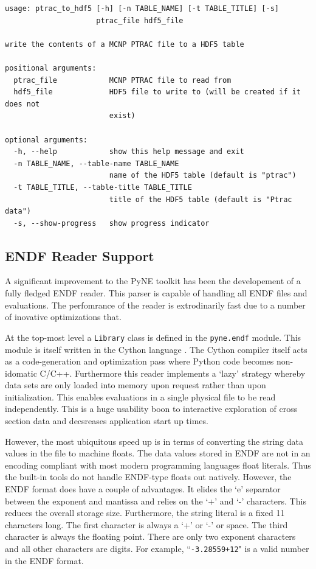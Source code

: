 \documentclass{ansconf}
\begin{document}
\begin{lstlisting}[frame=single,basicstyle=\scriptsize,label=fig_ptractohdf5,caption=Usage description of the PTRAC to HDF5 command line utility.]
usage: ptrac_to_hdf5 [-h] [-n TABLE_NAME] [-t TABLE_TITLE] [-s]
                     ptrac_file hdf5_file

write the contents of a MCNP PTRAC file to a HDF5 table

positional arguments:
  ptrac_file            MCNP PTRAC file to read from
  hdf5_file             HDF5 file to write to (will be created if it does not
                        exist)

optional arguments:
  -h, --help            show this help message and exit
  -n TABLE_NAME, --table-name TABLE_NAME
                        name of the HDF5 table (default is "ptrac")
  -t TABLE_TITLE, --table-title TABLE_TITLE
                        title of the HDF5 table (default is "Ptrac data")
  -s, --show-progress   show progress indicator
\end{lstlisting}

\subsection{ENDF Reader Support}

A significant improvement to the PyNE toolkit has been the developement of 
a fully fledged ENDF \cite{mclane2001endf} reader.  This parser is capable 
of handling all ENDF files and evaluations. The perfomrance of the reader is 
extrodinarily fast due to a number of inovative optimizations that.

At the top-most level a \texttt{Library} class is defined in the \texttt{pyne.endf}
module.  This module is itself written in the Cython language \cite{behnel2010cython}.
The Cython compiler itself acts as a code-generation and optimization pass where
Python code becomes non-idomatic C/C++.  Furthermore this reader implements a
`lazy' strategy whereby data sets are only loaded into memory upon request rather 
than upon initialization.  This enables evaluations in a single physical file to be 
read independently.  This is a huge usability boon to interactive exploration of 
cross section data and decsreases application start up times.

However, the most ubiquitous speed up is in terms of converting the string
data values in the file to machine floats.  The data values stored in ENDF 
are not in an encoding compliant with
most modern programming languages float literals. Thus the built-in tools do not 
handle ENDF-type floats out natively.  However, the ENDF format does have a couple
of advantages.  It elides the `e' separator between the exponent and mantissa and
relies on the `+' and `-' characters.  This reduces the overall storage size.
Furthermore, the string literal is a fixed 11 characters long. The first character
is always a `+' or `-' or space.  The third character is always the floating point.
There are only two exponent characters and all other characters are digits.  
For example, ``\texttt{-3.28559+12}" is a valid number in the ENDF format.
\end{document}
